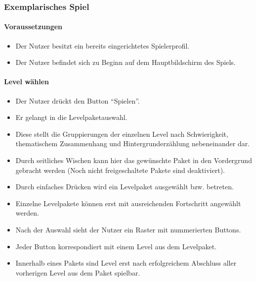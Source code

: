 \subsubsection{Exemplarisches Spiel}
\paragraph{Voraussetzungen}
\begin{itemize}
\item Der Nutzer besitzt ein bereits eingerichtetes Spielerprofil.
\item Der Nutzer befindet sich zu Beginn auf dem Hauptbildschirm des Spiels.
\end{itemize}

\paragraph{Level wählen}
\begin{itemize}
\item Der Nutzer drückt den Button "`Spielen"'.
\item Er gelangt in die Levelpaketauswahl.
\item Diese stellt die Gruppierungen der einzelnen Level nach Schwierigkeit, thematischem Zusammenhang und 
Hintergrunderzählung nebeneinander dar. 
\item Durch seitliches Wischen kann hier das gewünschte Paket in den Vordergrund gebracht werden (Noch nicht freigeschaltete Pakete sind deaktiviert).
\item Durch einfaches Drücken wird ein Levelpaket ausgewählt bzw. betreten.
\item Einzelne Levelpakete können erst mit ausreichenden Fortschritt angewählt werden.
\item Nach der Auswahl sieht der Nutzer ein Raster mit nummerierten Buttons.
\item Jeder Button korrespondiert mit einem Level aus dem Levelpaket.
\item Innerhalb eines Pakets sind Level erst nach erfolgreichem Abschluss aller vorherigen Level aus dem Paket spielbar.
\end{itemize}

